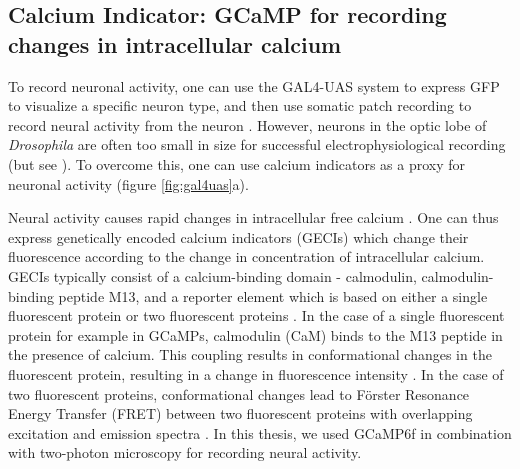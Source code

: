 \subsection{Calcium Indicator: GCaMP for recording changes in intracellular calcium}
To record neuronal activity, one can use the GAL4-UAS system to express GFP to visualize a specific neuron type, and then use somatic patch recording to record neural activity from the neuron \parencite{Wilson2004, Joesch2008}. However, neurons in the optic lobe of \textit{Drosophila} are often too small in size for successful electrophysiological recording (but see \cite{Groschner2022, Gruntman2018}). To overcome this, one can use calcium indicators as a proxy for neuronal activity (figure \ref{fig:gal4uas}a). 

Neural activity causes rapid changes in intracellular free calcium \parencite{Baker1971, Sabatini2002, Egelhaaf1995}. One can thus express genetically encoded calcium indicators (GECIs) which change their fluorescence according to the change in concentration of intracellular calcium. GECIs typically consist of a calcium-binding domain - calmodulin, calmodulin-binding peptide M13, and a reporter element which is based on either a single fluorescent protein or two fluorescent proteins \parencite{Broussard2014}. In the case of a single fluorescent protein for example in GCaMPs, calmodulin (CaM) binds to the M13 peptide in the presence of calcium. This coupling results in conformational changes in the fluorescent protein, resulting in a change in fluorescence intensity \parencite{Nagai2001}. In the case of two fluorescent proteins, conformational changes lead to Förster Resonance Energy Transfer (FRET) between two fluorescent proteins with overlapping excitation and emission spectra \parencite{Miyawaki1997}. In this thesis, we used GCaMP6f  \parencite{Chen2013} in combination with two-photon microscopy for recording neural activity.


